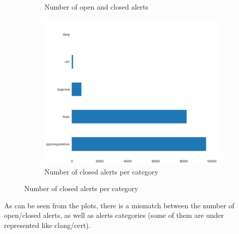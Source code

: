 \begin{figure}[H]
\begin{subfigure}{.5\textwidth}
		\caption{Number of open and closed alerts}\label{}
	\end{subfigure}%
	\begin{subfigure}{.5\textwidth}
		\centering
		\includegraphics[scale=0.3]{./src/data_analysis/closed_category_barh.jpg}
		\caption{Number of closed alerts per category}\label{}
	\end{subfigure}  
\end{figure}

As can be seen from the plots, there is a mismatch between the number of open/closed alerts, as well as alerts categories (some of them are under represented like clang/cert).


